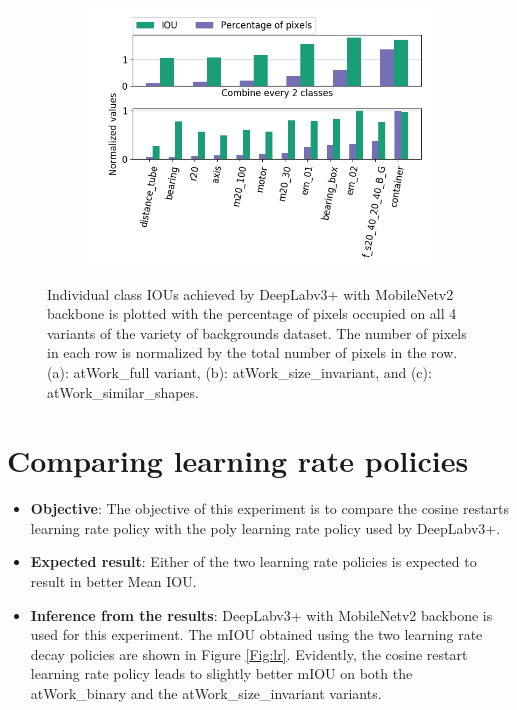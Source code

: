 \begin{figure}
\begin{subfigure}{.5\textwidth}
				\includegraphics[width=1\linewidth]{images/cls_iou_shape}
				\caption{}
				\label{Fig:clsiouc}
			\end{subfigure}
			\caption{Individual class IOUs achieved by DeepLabv3+ with MobileNetv2 backbone is plotted with the percentage of pixels occupied on all 4 variants of the variety of backgrounds dataset. The number of pixels in each row is normalized by the total number of pixels in the row. (a): atWork\_full variant, (b): atWork\_size\_invariant, and (c): atWork\_similar\_shapes.}
			\label{Fig:clsiou}
		\end{figure}

\section{Comparing learning rate policies}
\label{section:lr}
	
	\begin{itemize}
		\item \textbf{Objective}: The objective of this experiment is to compare the cosine restarts \cite{DBLP:journals/corr/LoshchilovH16a} learning rate policy with the poly learning rate policy used by DeepLabv3+.
		\item \textbf{Expected result}: Either of the two learning rate policies is expected to result in better Mean IOU.
		\item \textbf{Inference from the results}: DeepLabv3+ with MobileNetv2 backbone is used for this experiment. The mIOU obtained using the two learning rate decay policies are shown in Figure \ref{Fig:lr}. Evidently, the cosine restart learning rate policy leads to slightly better mIOU on both the atWork\_binary and the atWork\_size\_invariant variants.
	\end{itemize}
	
